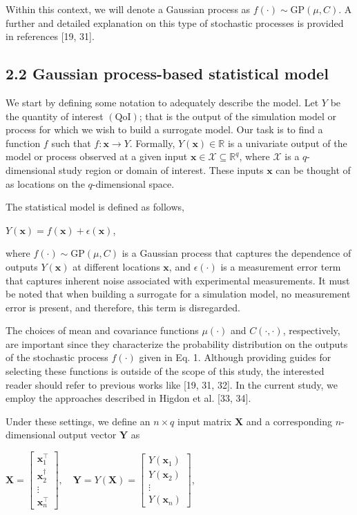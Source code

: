 \documentclass[10pt]{article}
\begin{document}
Within this context, we will denote a Gaussian process as $f(\cdot) \sim \mathrm{GP}(\mu, C)$. A further and detailed explanation on this type of stochastic processes is provided in references [19, 31].

\subsection*{2.2 Gaussian process-based statistical model}
We start by defining some notation to adequately describe the model. Let $Y$ be the quantity of interest $(\mathrm{QoI})$; that is the output of the simulation model or process for which we wish to build a surrogate model. Our task is to find a function $f$ such that $f: \mathbf{x} \rightarrow Y$. Formally, $Y(\mathbf{x}) \in \mathbb{R}$ is a univariate output of the model or process observed at a given input $\mathbf{x} \in \mathcal{X} \subseteq \mathbb{R}^{q}$, where $\mathcal{X}$ is a $q$-dimensional study region or domain of interest. These inputs $\mathbf{x}$ can be thought of as locations on the $q$-dimensional space.

The statistical model is defined as follows,

$Y(\mathbf{x})=f(\mathbf{x})+\epsilon(\mathbf{x})$,

where $f(\cdot) \sim \mathrm{GP}(\mu, C)$ is a Gaussian process that captures the dependence of outputs $Y(\mathbf{x})$ at different locations $\mathbf{x}$, and $\epsilon(\cdot)$ is a measurement error term that captures inherent noise associated with experimental measurements. It must be noted that when building a surrogate for a simulation model, no measurement error is present, and therefore, this term is disregarded.

The choices of mean and covariance functions $\mu(\cdot)$ and $C(\cdot, \cdot)$, respectively, are important since they characterize the probability distribution on the outputs of the stochastic process $f(\cdot)$ given in Eq. 1. Although providing guides for selecting these functions is outside of the scope of this study, the interested reader should refer to previous works like [19, 31, 32]. In the current study, we employ the approaches described in Higdon et al. [33, 34].

Under these settings, we define an $n \times q$ input matrix $\mathbf{X}$ and a corresponding $n$-dimensional output vector $\mathbf{Y}$ as

$\mathbf{X}=\left[\begin{array}{c}\mathbf{x}_{1}^{\top} \\ \mathbf{x}_{2}^{\dagger} \\ \vdots \\ \mathbf{x}_{n}^{\top}\end{array}\right], \quad \mathbf{Y}=Y(\mathbf{X})=\left[\begin{array}{c}Y\left(\mathbf{x}_{1}\right) \\ Y\left(\mathbf{x}_{2}\right) \\ \vdots \\ Y\left(\mathbf{x}_{n}\right)\end{array}\right]$,
\end{document}
